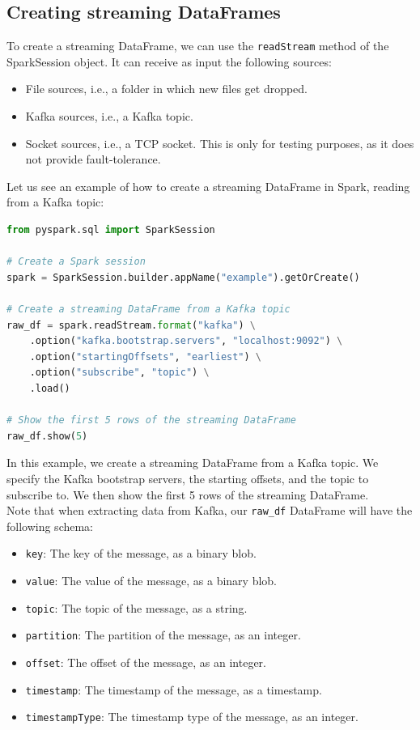 \subsection{Creating streaming DataFrames}

To create a streaming DataFrame, we can use the \texttt{readStream} method of the SparkSession object.
It can receive as input the following sources:

\begin{itemize}
    \item File sources, i.e., a folder in which new files get dropped.

    \item Kafka sources, i.e., a Kafka topic.
    
    \item Socket sources, i.e., a TCP socket. This is only for testing purposes, as it does not
    provide fault-tolerance.
\end{itemize}

Let us see an example of how to create a streaming DataFrame in Spark, reading from a Kafka topic:

\begin{lstlisting}[language=Python]
from pyspark.sql import SparkSession

# Create a Spark session
spark = SparkSession.builder.appName("example").getOrCreate()

# Create a streaming DataFrame from a Kafka topic
raw_df = spark.readStream.format("kafka") \
    .option("kafka.bootstrap.servers", "localhost:9092") \
    .option("startingOffsets", "earliest") \
    .option("subscribe", "topic") \
    .load()

# Show the first 5 rows of the streaming DataFrame
raw_df.show(5)
\end{lstlisting}

In this example, we create a streaming DataFrame from a Kafka topic. We specify the Kafka bootstrap
servers, the starting offsets, and the topic to subscribe to. We then show the first 5 rows of the
streaming DataFrame.\\

Note that when extracting data from Kafka, our \texttt{raw\_df} DataFrame will have the following
schema:

\begin{itemize}
    \item \texttt{key}: The key of the message, as a binary blob.
    \item \texttt{value}: The value of the message, as a binary blob.
    \item \texttt{topic}: The topic of the message, as a string.
    \item \texttt{partition}: The partition of the message, as an integer.
    \item \texttt{offset}: The offset of the message, as an integer.
    \item \texttt{timestamp}: The timestamp of the message, as a timestamp.
    \item \texttt{timestampType}: The timestamp type of the message, as an integer.
\end{itemize}

